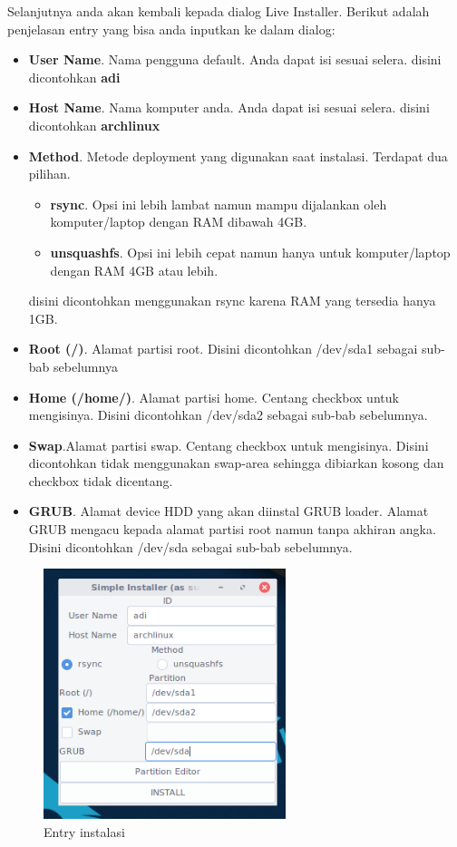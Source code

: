 \documentclass[12pt,]{article}
\begin{document}
	Selanjutnya anda akan kembali kepada dialog Live Installer.
	Berikut adalah penjelasan entry yang bisa anda inputkan ke dalam dialog:
	
	\begin{itemize}
		\item \textbf{User Name}. Nama pengguna default. Anda dapat isi sesuai selera. disini dicontohkan \textbf{adi}
		\item \textbf{Host Name}. Nama komputer anda. Anda dapat isi sesuai selera. disini dicontohkan \textbf{archlinux}
		\item \textbf{Method}. Metode deployment yang digunakan saat instalasi. Terdapat dua pilihan.
		\begin{itemize}
			\item \textbf{rsync}. Opsi ini lebih lambat namun mampu dijalankan oleh komputer/laptop dengan RAM dibawah 4GB.
			\item \textbf{unsquashfs}. Opsi ini lebih cepat namun hanya untuk komputer/laptop dengan RAM 4GB atau lebih.
		\end{itemize}
		disini dicontohkan menggunakan rsync karena RAM yang tersedia hanya 1GB.
		\item \textbf{Root (/)}. Alamat partisi root. Disini dicontohkan /dev/sda1 sebagai sub-bab sebelumnya
		\item \textbf{Home (/home/)}. Alamat partisi home. Centang checkbox untuk mengisinya.
		Disini dicontohkan /dev/sda2 sebagai sub-bab sebelumnya.
		\item \textbf{Swap}.Alamat partisi swap. Centang checkbox untuk mengisinya.
		Disini dicontohkan tidak menggunakan swap-area sehingga dibiarkan kosong dan checkbox tidak dicentang.
		\item \textbf{GRUB}. Alamat device HDD yang akan diinstal GRUB loader.
		Alamat GRUB mengacu kepada alamat partisi root namun tanpa akhiran angka. 
		Disini dicontohkan /dev/sda sebagai sub-bab sebelumnya.
	\end{itemize}

	\begin{figure}[h]
		\centering
		\includegraphics[width=200pt]{installhdd/step_16}
		\caption{Entry instalasi}
	\end{figure}
\end{document}
